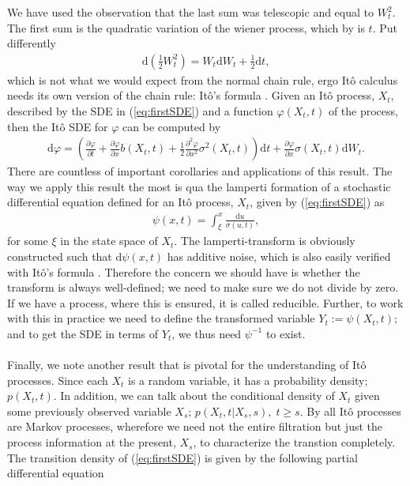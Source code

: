 We have used the observation that the last sum was telescopic and equal to $W_t^2$. The first sum is the quadratic variation of the wiener process, which by \cite[theorem 11.34]{Hansen2022} is $t$. Put differently
\begin{align}
    \mathrm{d}\left(\frac{1}{2}W_t^2\right) = W_t\mathrm{d}W_t + \frac{1}{2}\mathrm{d}t,
\end{align}
which is not what we would expect from the normal chain rule, ergo Itô calculus needs its own version of the chain rule: Itô's formula \cite[Theorem 4.2]{Srkk2019}.  Given an Itô process, $X_t$, described by the SDE in (\ref{eq:firstSDE}) and a function $\varphi(X_t, t)$ of the process, then the Itô SDE for $\varphi$ can be computed by
\begin{align}
    \mathrm{d}\varphi = \left(\frac{\partial \varphi}{\partial t} + \frac{\partial\varphi}{\partial x}b(X_t, t) + \frac{1}{2} \frac{\partial^2 \varphi}{\partial x^2}\sigma^2(X_t, t) \right)\mathrm{d}t + \frac{\partial\varphi}{\partial x}\sigma(X_t, t) \mathrm{d}W_t.
\end{align}
There are countless of important corollaries and applications of this result. The way we apply this result the most is qua the lamperti formation of a stochastic differential equation defined for an Itô process, $X_t$, given by (\ref{eq:firstSDE}) as
\begin{align}
    \psi(x, t) = \int_{\xi}^x \frac{\mathrm{d}u}{\sigma(u, t)}, \label{eq:firstLamperti}
\end{align}
for some $\xi$ in the state space of $X_t$. The lamperti-transform is obviously constructed such that $\mathrm{d}\psi(x, t)$ has additive noise, which is also easily verified with Itô's formula \cite[equation (7.5)]{Srkk2019}. Therefore the concern we should have is whether the transform is always well-defined; we need to make sure we do not divide by zero. If we have a process, where this is ensured, it is called reducible. Further, to work with this in practice we need to define the transformed variable $Y_t := \psi(X_t, t)$; and to get the SDE in terms of $Y_t$, we thus need $\psi^{-1}$ to exist.\\\\
Finally, we note another result that is pivotal for the understanding of Itô processes. Since each $X_t$ is a random variable, it has a probability density; $p(X_t, t)$. In addition, we can talk about the conditional density of $X_t$ given some previously observed variable $X_s$; $p(X_t, t | X_s, s), \; t\geq s$. By \cite[theorem 7.1.2]{Oksendal2003_yu} all Itô processes are Markov processes, wherefore we need not the entire filtration but just the process information at the present, $X_s$, to characterize the transtion completely. The transition density of (\ref{eq:firstSDE}) is given by the following partial differential equation
